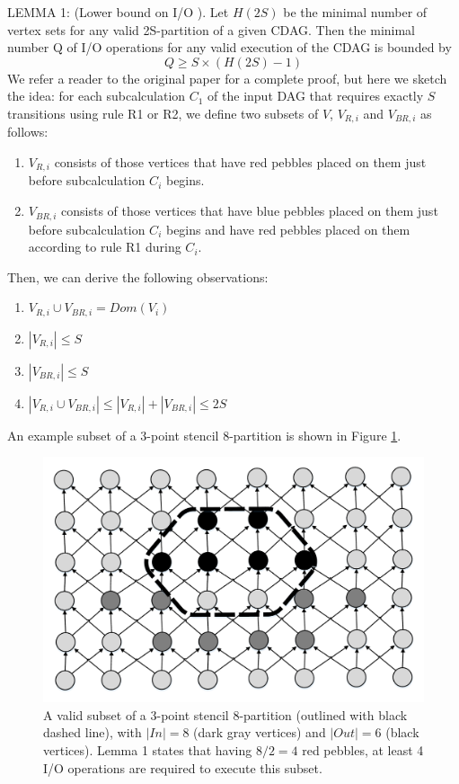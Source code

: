 \documentclass[sigconf]{acmart}
\begin{document}
	LEMMA 1: (Lower bound on I/O \cite{redblue}). Let $H(2S)$ be the minimal 
	number of 
	vertex sets for any valid 2S-partition of a given CDAG. Then the minimal 
	number Q of I/O operations for any valid execution of the CDAG is bounded 
	by	
	\begin{equation}
	\label{eq:redbluebound}
	Q \ge S \times (H(2S) - 1)
	\end{equation}
	We refer a reader to the original paper for a complete proof, but here we 
	sketch the idea: for each subcalculation $C_1$ of the input DAG that 
	requires exactly $S$ transitions using rule R1 or R2, we define two subsets 
	of $V$, $V_{R,i}$ and $V_{BR,i}$ as 
	follows:
	\begin{enumerate}
		\item $V_{R,i}$ consists of those vertices that have red pebbles placed 
		on 
		them just before subcalculation $C_i$ begins.
		\item $V_{BR,i}$ consists of those vertices that have blue pebbles 
		placed 
		on them just before subcalculation $C_i$ begins and have red pebbles 
		placed on them according to rule R1 during $C_i$.
	\end{enumerate}
	
	Then, we can derive the following observations:
	\begin{enumerate}
		\item $V_{R,i} \cup V_{BR,i} = Dom(V_i)$
		\item $|V_{R,i}| \le S$
		\item $|V_{BR,i}| \le S$
		\item $|V_{R,i} \cup V_{BR,i}| \le |V_{R,i}| + |V_{BR,i}| \le 2S$
	\end{enumerate}
	
	An example subset of a 3-point stencil 8-partition is shown in Figure 
	\ref{fig:spart-stencil}.
	
	\begin{figure}
		\includegraphics[width=2\columnwidth/3]{figures/stencils}
		\caption{A valid subset of a 3-point stencil 8-partition (outlined with 
		black dashed line), with $|In| = 8$ (dark gray vertices) and $|Out| = 
		6$ (black vertices). Lemma 1 states that having $8/2 = 4$ red pebbles, 
		at least 4 I/O operations are required to execute this subset.}
		\label{fig:spart-stencil}
	\end{figure}
	
\end{document}
